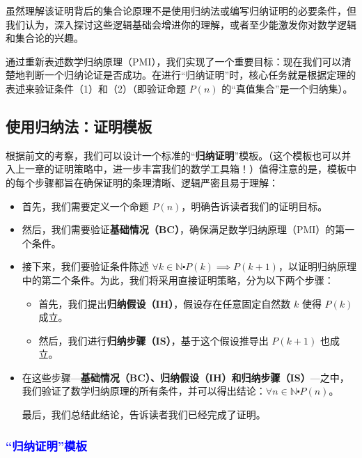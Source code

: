 虽然理解该证明背后的集合论原理不是使用归纳法或编写归纳证明的必要条件，但我们认为，深入探讨这些逻辑基础会增进你的理解，或者至少能激发你对数学逻辑和集合论的兴趣。

通过重新表述数学归纳原理（PMI），我们实现了一个重要目标：现在我们可以清楚地判断一个归纳论证是否成功。在进行``归纳证明''时，核心任务就是根据定理的表述来验证条件（1）和（2）（即验证命题 $P(n)$ 的``真值集合''是一个归纳集）。

\subsection{使用归纳法：证明模板}

根据前文的考察，我们可以设计一个标准的``\textbf{归纳证明}''模板。（这个模板也可以并入上一章的证明策略中，进一步丰富我们的数学工具箱！）值得注意的是，模板中的每个步骤都旨在确保证明的条理清晰、逻辑严密且易于理解：

\begin{itemize}
    \item 首先，我们需要定义一个命题 $P(n)$，明确告诉读者我们的证明目标。
    \item 然后，我们需要验证\textbf{基础情况（BC）}，确保满足数学归纳原理（PMI）的第一个条件。
    \item 接下来，我们要验证条件陈述 $\forall k \in \mathbb{N} \centerdot P(k) \implies P(k+1)$，以证明归纳原理中的第二个条件。为此，我们将采用直接证明策略，分为以下两个步骤：
        \begin{itemize}
            \item 首先，我们提出\textbf{归纳假设（IH）}，假设存在任意固定自然数 $k$ 使得 $P(k)$ 成立。
            \item 然后，我们进行\textbf{归纳步骤（IS）}，基于这个假设推导出 $P(k+1)$ 也成立。
        \end{itemize} 
    \item 在这些步骤---\textbf{基础情况（BC）、归纳假设（IH）和归纳步骤（IS）}---之中，我们验证了数学归纳原理的所有条件，并可以得出结论：$\forall n \in \mathbb{N} \centerdot P(n)$。
    
    最后，我们总结此结论，告诉读者我们已经完成了证明。
\end{itemize}

\subsubsection*{\textcolor{blue}{``归纳证明''模板}}

